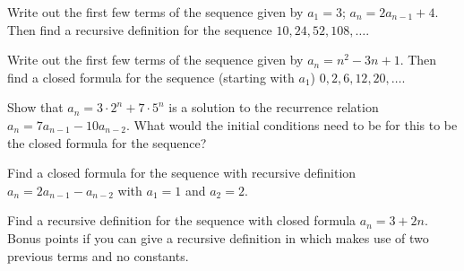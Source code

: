 \documentclass[11pt,]{book}
\theoremstyle{ptxplainnotitle}
\theoremstyle{ptxplaintitle}
\theoremstyle{ptxdefinitionnotitle}
\theoremstyle{ptxdefinitiontitle}
\theoremstyle{ptxdefinitionnotitle}
\theoremstyle{ptxdefinitiontitle}
\theoremstyle{ptxdefinitionnotitle}
\theoremstyle{ptxdefinitiontitle}
\theoremstyle{ptxdefinitiontitlenonumber}
\theoremstyle{ptxdefinitiontitlenonumber}
\numberwithin{equation}{chapter}
\begin{document}
\begin{divisionexercise}{6}\hypertarget{exercise-6}{}
\hypertarget{p-136}{}%
Write out the first few terms of the sequence given by \(a_1 = 3\); \(a_n = 2a_{n-1} + 4\). Then find a recursive definition for the sequence \(10, 24, 52, 108, \ldots\).%
\end{divisionexercise}%
\begin{divisionexercise}{7}\hypertarget{exercise-7}{}
\hypertarget{p-138}{}%
Write out the first few terms of the sequence given by \(a_n = n^2 - 3n + 1\). Then find a closed formula for the sequence (starting with \(a_1\)) \(0, 2, 6, 12, 20, \ldots\).%
\end{divisionexercise}%
\begin{divisionexercise}{8}\hypertarget{exercise-8}{}
\hypertarget{p-140}{}%
Show that \(a_n = 3\cdot 2^n + 7\cdot 5^n\) is a solution to the recurrence relation \(a_n = 7a_{n-1} - 10a_{n-2}\).   What would the initial conditions need to be for this to be the closed formula for the sequence?%
\end{divisionexercise}%
\begin{divisionexercise}{9}\hypertarget{exercise-9}{}
\hypertarget{p-142}{}%
Find a closed formula for the sequence with recursive definition \(a_n = 2a_{n-1} - a_{n-2}\) with \(a_1 = 1\) and \(a_2 = 2\).%
\end{divisionexercise}%
\begin{divisionexercise}{10}\hypertarget{exercise-10}{}
\hypertarget{p-144}{}%
Find a recursive definition for the sequence with closed formula \(a_n = 3 + 2n\). Bonus points if you can give a recursive definition in which makes use of two previous terms and no constants.%
\end{divisionexercise}%
\end{document}
